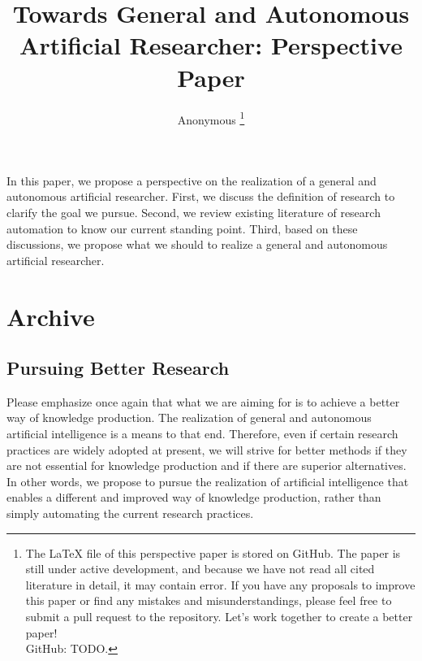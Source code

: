 \documentclass{book}
\title{Towards General and Autonomous Artificial Researcher: Perspective Paper}
\author{Anonymous \footnote{The LaTeX file of this perspective paper is stored on GitHub. The paper is still under active development, and because we have not read all cited literature in detail, it may contain error. If you have any proposals to improve this paper or find any mistakes and misunderstandings, please feel free to submit a pull request to the repository. Let's work together to create a better paper! \\ GitHub: TODO. }}
\newenvironment{abstract}{}{}
\begin{document}
\sloppy
\maketitle
\tableofcontents

\begin{abstract}
    In this paper, we propose a perspective on the realization of a general and autonomous artificial researcher. First, we discuss the definition of research to clarify the goal we pursue. Second, we review existing literature of research automation to know our current standing point. Third, based on these discussions, we propose what we should to realize a general and autonomous artificial researcher.
\end{abstract}







% 



% 


\appendix

\chapter{Archive}

\section{Pursuing Better Research}
Please emphasize once again that what we are aiming for is to achieve a better way of knowledge production. The realization of general and autonomous artificial intelligence is a means to that end. Therefore, even if certain research practices are widely adopted at present, we will strive for better methods if they are not essential for knowledge production and if there are superior alternatives. In other words, we propose to pursue the realization of artificial intelligence that enables a different and improved way of knowledge production, rather than simply automating the current research practices.
\end{document}
